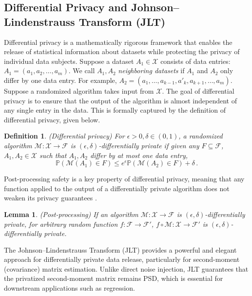\documentclass[11pt]{article}
\newtheorem{lemma}{Lemma}%
\newtheorem{definition}{Definition}%
\newcommand{\Prob}{\mathbb{P}}
\begin{document}
\subsection{Differential Privacy and Johnson--Lindenstrauss Transform (JLT)}\label{sec:prelim-jlt}
Differential privacy is a mathematically rigorous framework that enables the release of statistical information about datasets while protecting the privacy of individual data subjects. Suppose a dataset $A_1\in \mathcal{X}$ consists of data entries: $A_1 = (a_1,a_2,\dotsc,a_m)$. We call $A_1, A_2$  \emph{neighboring datasets} if $A_1$ and $A_2$ only differ by one data entry. For example, $A_2 = (a_1,\dotsc,a_{k-1},a'_k,a_{k+1},\dotsc,a_m)$. Suppose a randomized algorithm takes input from $\mathcal{X}$. The goal of differential privacy is to ensure that the output of the algorithm is almost independent of any single entry in the data. This is formally captured by the definition of differential privacy, given below.
\begin{definition}
    (Differential privacy) For $\epsilon>0,\delta\in(0,1)$, a randomized algorithm $\mathcal{M}:\mathcal{X}\to\mathcal{F}$ is $(\epsilon,\delta)$-differentially private if given any $F\subseteq\mathcal{F} $, $A_1,A_2\in\mathcal{X}$ such that $A_1,A_2$ differ by at most one data entry,
    \[
    \Prob(\mathcal{M}(A_1)\in F) \leq e^\epsilon\Prob(\mathcal{M}(A_2)\in F)+\delta\,.
    \]
\end{definition}

Post-processing safety is a key property of differential privacy, meaning that any function applied to the output of a differentially private algorithm does not weaken its privacy guarantees \citep[Proposition 2.1]{DworkRoth}.

\begin{lemma}\label{lem:DP-post}
    (Post-processing) If an algorithm $\mathcal{M}:\mathcal{X}\to\mathcal{F}$ is $(\epsilon,\delta)$-differentially private, for arbitrary random function $f:\mathcal{F}\to\mathcal{F}'$, $f\circ\mathcal{M} :\mathcal{X}\to \mathcal{F}'$ is $(\epsilon,\delta)$-differentially private.
\end{lemma}



The Johnson--Lindenstrauss Transform (JLT) provides a powerful and elegant approach for differentially private data release, particularly for second-moment (covariance) matrix estimation. Unlike direct noise injection, JLT guarantees that the privatized second-moment matrix remains PSD, which is essential for downstream applications such as regression.
\end{document}
